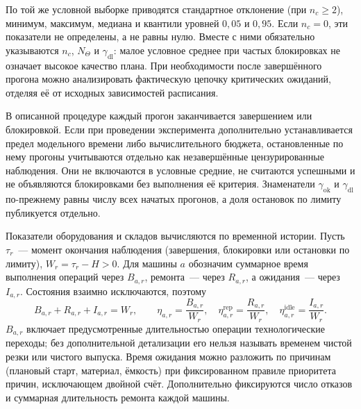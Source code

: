 По той же условной выборке приводятся стандартное отклонение (при $n_c\geq2$), минимум, максимум, медиана и квантили уровней $0{,}05$ и $0{,}95$. Если $n_c=0$, эти показатели не определены, а не равны нулю. Вместе с ними обязательно указываются $n_c$, $N_{\Theta}$ и $\gamma_{\mathrm{dl}}$: малое условное среднее при частых блокировках не означает высокое качество плана. При необходимости после завершённого прогона можно анализировать фактическую цепочку критических ожиданий, отделяя её от исходных зависимостей расписания.

В описанной процедуре каждый прогон заканчивается завершением или блокировкой. Если при проведении эксперимента дополнительно устанавливается предел модельного времени либо вычислительного бюджета, остановленные по нему прогоны учитываются отдельно как незавершённые цензурированные наблюдения. Они не включаются в условные средние, не считаются успешными и не объявляются блокировками без выполнения её критерия. Знаменатели $\gamma_{\mathrm{ok}}$ и $\gamma_{\mathrm{dl}}$ по-прежнему равны числу всех начатых прогонов, а доля остановок по лимиту публикуется отдельно.

Показатели оборудования и складов вычисляются по временной истории. Пусть $\tau_r$~--- момент окончания наблюдения (завершения, блокировки или остановки по лимиту), $W_r=\tau_r-H>0$. Для машины $a$ обозначим суммарное время выполнения операций через $B_{a,r}$, ремонта~--- через $R_{a,r}$, а ожидания~--- через $I_{a,r}$. Состояния взаимно исключаются, поэтому
\[
B_{a,r}+R_{a,r}+I_{a,r}=W_r,\qquad
\eta_{a,r}=\frac{B_{a,r}}{W_r},\quad
\eta^{\mathrm{rep}}_{a,r}=\frac{R_{a,r}}{W_r},\quad
\eta^{\mathrm{idle}}_{a,r}=\frac{I_{a,r}}{W_r}.
\]
$B_{a,r}$ включает предусмотренные длительностью операции технологические переходы; без дополнительной детализации его нельзя называть временем чистой резки или чистого выпуска. Время ожидания можно разложить по причинам (плановый старт, материал, ёмкость) при фиксированном правиле приоритета причин, исключающем двойной счёт. Дополнительно фиксируются число отказов и суммарная длительность ремонта каждой машины.

